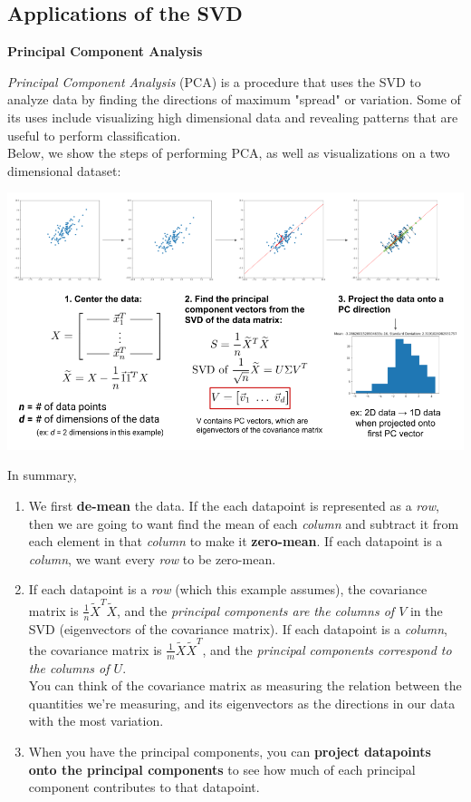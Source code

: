 \renewcommand{\arraystretch}{1.25}

\subsection*{Applications of the SVD}
\textbf{Principal Component Analysis}

\textit{Principal Component Analysis} (PCA) is a procedure that uses the SVD to analyze data by finding the directions of maximum "spread" or variation. Some of its uses include visualizing high dimensional data and revealing patterns that are useful to perform classification.\\
\newline
Below, we show the steps of performing PCA, as well as visualizations on a two dimensional dataset:

\includegraphics[width=\textwidth]{figures/pca-steps}

In summary,
\begin{enumerate}
    \item We first \textbf{de-mean} the data. If the each datapoint is represented as a \textit{row}, then we are going to want find the mean of each \textit{column} and subtract it from each element in that \textit{column} to make it \textbf{zero-mean}. If each datapoint is a \textit{column}, we want every \textit{row} to be zero-mean.
    \item If each datapoint is a \textit{row} (which this example assumes), the covariance matrix is $\frac{1}{n} \widetilde{X}^T\widetilde{X}$, and the \textit{principal components are the columns of $V$} in the SVD (eigenvectors of the covariance matrix). 
    If each datapoint is a \textit{column}, the covariance matrix is $\frac{1}{m} \widetilde{X}\widetilde{X}^T$, and the \textit{principal components correspond to the columns of $U$}. \\
    \newline
    You can think of the covariance matrix as measuring the relation between the quantities we're measuring, and its eigenvectors as the directions in our data with the most variation.
    \item When you have the principal components, you can \textbf{project datapoints onto the principal components} to see how much of each principal component contributes to that datapoint.
\end{enumerate}

